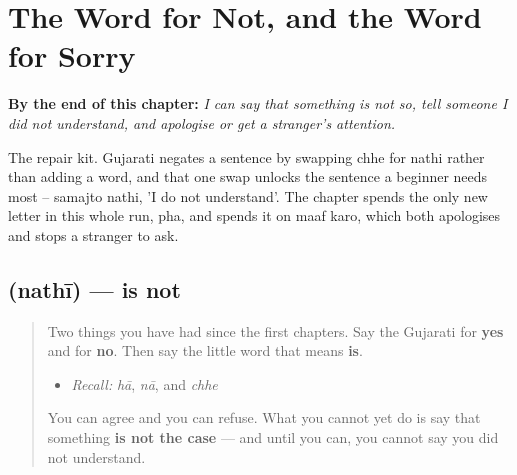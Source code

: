 
\chapter{The Word for Not, and the Word for Sorry}
\label{ch:gu-not-and-sorry}

\begin{chapteropening}
\textbf{By the end of this chapter:} \emph{I can say that something is not so, tell someone I did not understand, and apologise or get a stranger's attention.}

The repair kit. Gujarati negates a sentence by swapping chhe for nathi rather than adding a word, and that one swap unlocks the sentence a beginner needs most -- samajto nathi, 'I do not understand'. The chapter spends the only new letter in this whole run, pha, and spends it on maaf karo, which both apologises and stops a stranger to ask.
\end{chapteropening}

\section[\texorpdfstring{\gu{નથી} (nathī)}{નથી (nathī)}]{ (nathī) — is not}

\label{lesson:GU-C31-nathi}



\begin{quote}
Two things you have had since the first chapters. Say the Gujarati for \textbf{yes} and for \textbf{no}. Then say the little word that means \textbf{is}.

\begin{itemize}
\raggedright
  \item \emph{Recall:} \emph{hā}, \emph{nā}, and \emph{chhe}
\end{itemize}

You can agree and you can refuse. What you cannot yet do is say that something \textbf{is not the case} — and until you can, you cannot say you did not understand.
\end{quote}

